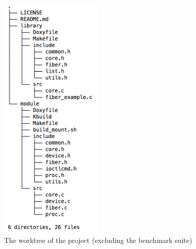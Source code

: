 \documentclass[a4paper,10pt]{article}
\begin{document}
 \begin{figure}[htb!]
   \centering
   \centering
   \includegraphics[height=12cm]{imgs/tree}
   \caption{The worktree of the project (excluding the benchmark suite)}
   \label{fig:2figsA}
 \end{figure}
\end{document}

